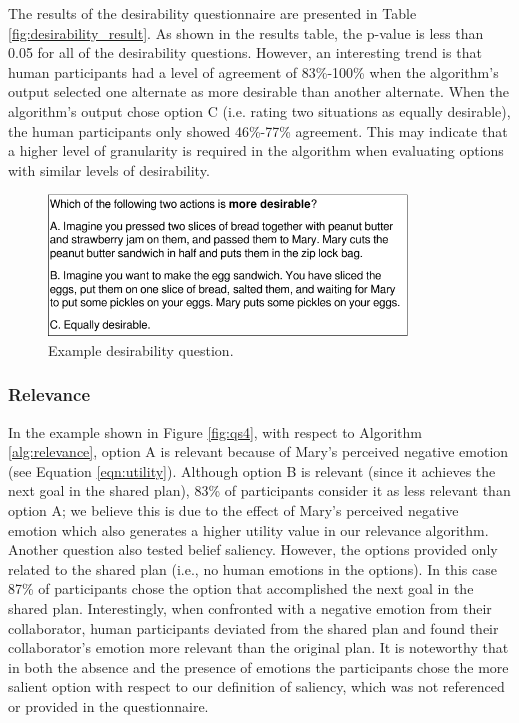\documentclass[12pt]{report}
\begin{document}
The results of the desirability questionnaire are presented in Table
\ref{fig:desirability_result}. As shown in the results table, the p-value is
less than 0.05 for all of the desirability questions. However, an interesting
trend is that human participants had a level of agreement of 83\%-100\% when the
algorithm's output selected one alternate as more desirable than another
alternate. When the algorithm's output chose option C (i.e. rating two
situations as equally desirable), the human participants only showed 46\%-77\%
agreement. This may indicate that a higher level of granularity is required in
the algorithm when evaluating options with similar levels of desirability.

\begin{figure}[tbh]
  \centering
  \includegraphics[width=0.85\textwidth]{figure/question-sample3-croped.pdf}
  \caption{{Example desirability question.}}
  \label{fig:qs3}
\end{figure}

\subsubsection{Relevance}
\label{sec:relevance-crowdsourcing}
In the example shown in Figure \ref{fig:qs4}, with respect to Algorithm
\ref{alg:relevance}, option A is relevant because of Mary's perceived negative
emotion (see Equation \ref{eqn:utility}). Although option B is relevant (since
it achieves the next goal in the shared plan), 83\% of participants consider it as
less relevant than option A; we believe this is due to the effect of Mary's
perceived negative emotion which also generates a higher utility value in our
relevance algorithm. Another question also tested belief saliency. However, the
options provided only related to the shared plan (i.e., no human emotions in the
options). In this case 87\% of participants chose the option that accomplished the
next goal in the shared plan. Interestingly, when confronted with a negative
emotion from their collaborator, human participants deviated from the shared plan
and found their collaborator's emotion more relevant than the original plan. It
is noteworthy that in both the absence and the presence of emotions the
participants chose the more salient option with respect to our definition of
saliency, which was not referenced or provided in the questionnaire.
\end{document}
